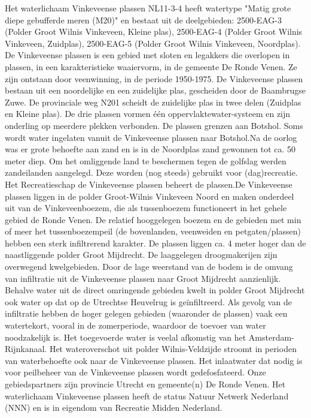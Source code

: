 \documentclass[12pt]{article}\usepackage[]{graphicx}\usepackage[]{color}
\begin{document}
\begin{tcbposter}
{  %
Het waterlichaam Vinkeveense plassen NL11-3-4 heeft watertype "Matig grote diepe gebufferde meren (M20)" en bestaat uit de deelgebieden: 2500-EAG-3 (Polder Groot Wilnis Vinkeveen, Kleine plas), 2500-EAG-4 (Polder Groot Wilnis Vinkeveen, Zuidplas), 2500-EAG-5 (Polder Groot Wilnis Vinkeveen, Noordplas). \\  De Vinkeveense plassen is een gebied met sloten en legakkers die overlopen in plassen, in een karakteristieke waaiervorm, in de gemeente De Ronde Venen. Ze zijn ontstaan door veenwinning, in de periode 1950-1975. De Vinkeveense plassen bestaan uit een noordelijke en een zuidelijke plas, gescheiden door de Baambrugse Zuwe. De provinciale weg N201 scheidt de zuidelijke plas in twee delen (Zuidplas en Kleine plas). De drie plassen vormen één oppervlaktewater-systeem en zijn onderling op meerdere plekken verbonden. De plassen grenzen aan Botshol. Soms wordt water ingelaten vanuit de Vinkeveense plassen naar Botshol.Na de oorlog was er grote behoefte aan zand en is in de Noordplas zand gewonnen tot ca. 50 meter diep. Om het omliggende land te beschermen tegen de golfslag werden zandeilanden aangelegd. Deze worden (nog steeds) gebruikt voor (dag)recreatie. Het Recreatieschap de Vinkeveense plassen beheert de plassen.De Vinkeveense plassen liggen in de polder Groot-Wilnis Vinkeveen Noord en maken onderdeel uit van de Vinkeveenboezem, die als tussenboezem functioneert in het gehele gebied de Ronde Venen. De relatief hooggelegen boezem en de gebieden met min of meer het tussenboezempeil (de bovenlanden, veenweiden en petgaten/plassen) hebben een sterk infiltrerend karakter. De plassen liggen ca. 4 meter hoger dan de naastliggende polder Groot Mijdrecht. De laaggelegen droogmakerijen zijn overwegend kwelgebieden. Door de lage weerstand van de bodem is de omvang van infiltratie uit de Vinkeveense plassen naar Groot Mijdrecht  aanzienlijk. Behalve water uit de direct omringende gebieden kwelt in polder Groot Mijdrecht ook water op dat op de Utrechtse Heuvelrug is geïnfiltreerd. Als gevolg van de infiltratie hebben de hoger gelegen gebieden (waaronder de plassen) vaak een watertekort, vooral in de zomerperiode, waardoor de toevoer van water noodzakelijk is. Het toegevoerde water is veelal afkomstig van het Amsterdam-Rijnkanaal. Het wateroverschot uit polder Wilnis-Veldzijde stroomt in perioden van waterbehoefte ook naar de Vinkeveense plassen. Het inlaatwater dat nodig is voor peilbeheer van de Vinkeveense plassen wordt gedefosfateerd. Onze gebiedspartners zijn provincie Utrecht en gemeente(n) De Ronde Venen. Het waterlichaam Vinkeveense plassen heeft de status Natuur Netwerk Nederland (NNN) en is in eigendom van Recreatie Midden Nederland.}
   

\end{tcbposter}
\end{document}
